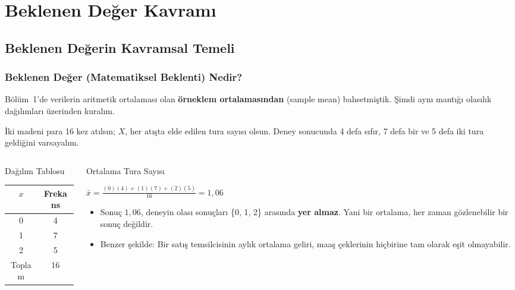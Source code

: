 \documentclass[light]{lutbeamer}
\begin{document}
\section{Beklenen Değer Kavramı}
\subsection{Beklenen Değerin Kavramsal Temeli}

\begin{frame}[fragile]
  \frametitle{Beklenen Değer (Matematiksel Beklenti) Nedir?}
  Bölüm~1'de verilerin aritmetik ortalaması olan \textbf{örneklem ortalamasından} (sample mean) bahsetmiştik. Şimdi aynı mantığı olasılık dağılımları üzerinden kuralım.

  \medskip
  İki madeni para 16 kez atılsın; $X$, her atışta elde edilen tura sayısı olsun. Deney sonucunda 4 defa sıfır, 7 defa bir ve 5 defa iki tura geldiğini varsayalım.
  \begin{columns}[T]
    \begin{column}{0.2\textwidth}
      \begin{block}{Dağılım Tablosu}
        \centering
        \scriptsize
        \begin{tabular}{@{}cc@{}}
          \toprule
          $x$ & Frekans \\
          \midrule
          0 & 4 \\
          1 & 7 \\
          2 & 5 \\
          \midrule
          Toplam & 16 \\
          \bottomrule
        \end{tabular}
      \end{block}
    \end{column}
    \begin{column}{0.75\textwidth}
      \begin{exampleblock}{Ortalama Tura Sayısı}
        \begin{center}
          $\bar{x} = \frac{(0)(4) + (1)(7) + (2)(5)}{16} = 1{,}06$
        \end{center}
      \end{exampleblock}
      \begin{itemize}
    \item Sonuç $1{,}06$, deneyin olası sonuçları \{0, 1, 2\} arasında \textbf{yer almaz}. Yani bir ortalama, her zaman gözlenebilir bir sonuç değildir.
    \item Benzer şekilde: Bir satış temsilcisinin aylık ortalama geliri, maaş çeklerinin hiçbirine tam olarak eşit olmayabilir.
  \end{itemize}
    \end{column}
  \end{columns}

\end{frame}
\end{document}
